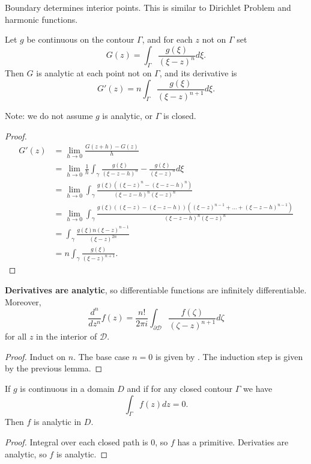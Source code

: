 \begin{remark}
	Boundary determines interior points. This is similar to Dirichlet Problem and harmonic functions.
\end{remark}

\begin{lemma}
	Let $g$ be continuous on the contour $\Gamma$, and for each $z$ not on $\Gamma$ set
	\[
		G(z) = \int_\Gamma \frac{g(\xi)}{\left( \xi - z \right) ^n} d \xi
	.\] 
	Then $G$ is analytic at each point not on $\Gamma$, and its derivative is
	\[
		G'(z) = n \int _\Gamma \frac{g(\xi)}{(\xi - z)^{n+1}} d \xi
	.\] 
\end{lemma}
Note: we do not assume $g$ is analytic, or $\Gamma$ is closed.
\begin{proof}
	\begin{align*}
		G'(z)
		&= \lim_{h \to 0} \frac{G(z + h) - G(z)}{h} \\
		&= \lim_{h \to 0} \frac{1}{h} \int _\gamma \frac{g(\xi)}{(\xi - z - h)^n} - \frac{g(\xi)}{(\xi - z)^n} d \xi \\
		&= \lim_{h \to 0} \int _\gamma \frac{g(\xi) \left( (\xi - z)^n - (\xi - z - h)^n \right) }{(\xi - z - h)^n (\xi - z)^n} \\
		&= \lim_{h \to 0} \int _\gamma \frac{g(\xi) \left( (\xi - z) - (\xi - z - h) \right)\left( (\xi - z)^{n - 1} + \ldots + (\xi - z- h)^{n - 1} \right)  }{(\xi - z - h)^n (\xi - z)^n} \\
		&= \int _\gamma \frac{g(\xi) n (\xi - z)^{n - 1}}{(\xi - z)^{2 n}} \\
		&= n \int _\gamma \frac{g(\xi)}{(\xi - z)^{n + 1}}
	.\end{align*}
\end{proof}


\begin{corollary}
	\textbf{Derivatives are analytic}, so differentiable functions are infinitely differentiable. Moreover,
\[
	\frac{d^n}{dz^n} f(z) = \frac{n!}{2 \pi i} \int _{\partial \mathcal{D}}\frac{f(\zeta)}{(\zeta - z)^{n+1}} d\zeta
\]
for all $z$ in the interior of $\mathcal{D}$.
\end{corollary}  
\begin{proof}
	Induct on $n$. The base case $n = 0$ is given by . The induction step is given by the previous lemma.
\end{proof}

\begin{theorem}
	If $g$ is continuous in a domain $D$ and if for any closed contour $\Gamma$ we have
	\[
		\int _\Gamma f(z) dz = 0
	.\] 
	Then $f$ is analytic in $D$.
\end{theorem}
\begin{proof}
	Integral over each closed path is $0$, so $f$ has a primitive. Derivaties are analytic, so $f$ is analytic.
\end{proof}


